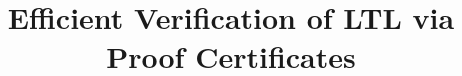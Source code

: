 \documentclass[acmlarge]{acmart}
\begin{document}
\title{Efficient Verification of LTL via Proof Certificates}









\end{document}
